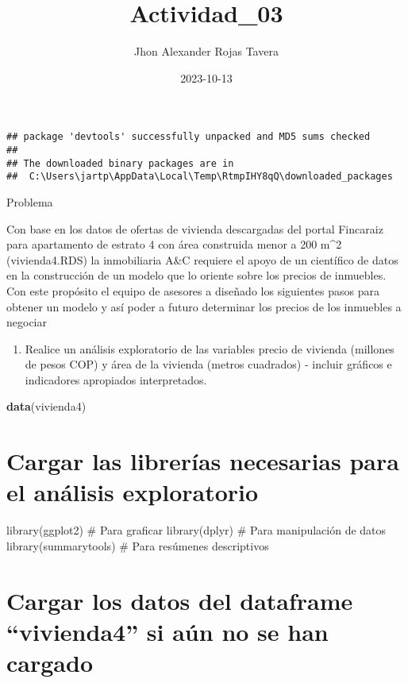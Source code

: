 \documentclass[
]{article}
\title{Actividad\_03}
\author{Jhon Alexander Rojas Tavera}
\date{2023-10-13}
\newenvironment{Shaded}{\begin{snugshade}}{\end{snugshade}}
\newcommand{\FunctionTok}[1]{\textcolor[rgb]{0.13,0.29,0.53}{\textbf{#1}}}
\newcommand{\NormalTok}[1]{#1}
\providecommand{\tightlist}{%
  \setlength{\itemsep}{0pt}\setlength{\parskip}{0pt}}
\begin{document}
\maketitle

{
\setcounter{tocdepth}{2}
\tableofcontents
}
\begin{verbatim}
## package 'devtools' successfully unpacked and MD5 sums checked
## 
## The downloaded binary packages are in
##  C:\Users\jartp\AppData\Local\Temp\RtmpIHY8qQ\downloaded_packages
\end{verbatim}

Problema

Con base en los datos de ofertas de vivienda descargadas del portal
Fincaraiz para apartamento de estrato 4 con área construida menor a 200
m\^{}2 (vivienda4.RDS) la inmobiliaria A\&C requiere el apoyo de un
científico de datos en la construcción de un modelo que lo oriente sobre
los precios de inmuebles. Con este propósito el equipo de asesores a
diseñado los siguientes pasos para obtener un modelo y así poder a
futuro determinar los precios de los inmuebles a negociar

\begin{enumerate}
\def\labelenumi{\arabic{enumi}.}
\tightlist
\item
  Realice un análisis exploratorio de las variables precio de vivienda
  (millones de pesos COP) y área de la vivienda (metros cuadrados) -
  incluir gráficos e indicadores apropiados interpretados.
\end{enumerate}

\begin{Shaded}
\begin{Highlighting}[]
\FunctionTok{data}\NormalTok{(vivienda4)}
\end{Highlighting}
\end{Shaded}

\hypertarget{cargar-las-libreruxedas-necesarias-para-el-anuxe1lisis-exploratorio}{%
\section{Cargar las librerías necesarias para el análisis
exploratorio}\label{cargar-las-libreruxedas-necesarias-para-el-anuxe1lisis-exploratorio}}

library(ggplot2) \# Para graficar library(dplyr) \# Para manipulación de
datos library(summarytools) \# Para resúmenes descriptivos

\hypertarget{cargar-los-datos-del-dataframe-vivienda4-si-auxfan-no-se-han-cargado}{%
\section{Cargar los datos del dataframe ``vivienda4'' si aún no se han
cargado}\label{cargar-los-datos-del-dataframe-vivienda4-si-auxfan-no-se-han-cargado}}
\end{document}
